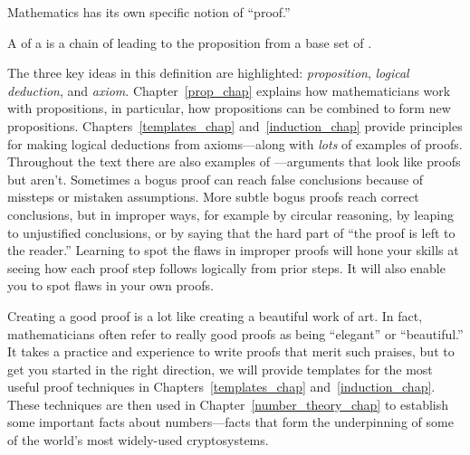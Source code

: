 Mathematics has its own specific notion of ``proof.''

\begin{definition*}
A  of a  is a chain of  leading to the proposition from a base set of .
\end{definition*}

The three key ideas in this definition are highlighted:
\emph{proposition}, \emph{logical deduction}, and \emph{axiom}.
Chapter~\ref{prop_chap} explains how mathematicians work with  propositions, in particular, how propositions can be combined
to form new propositions.  Chapters~\ref{templates_chap}
and~\ref{induction_chap} provide principles for making logical deductions
from axioms---along with \emph{lots} of examples of proofs.  Throughout
the text there are also examples of ---arguments that
look like proofs but aren't.  Sometimes a bogus proof can reach false
conclusions because of missteps or mistaken assumptions.  More subtle
bogus proofs reach correct conclusions, but in improper ways, for example
by circular reasoning, by leaping to unjustified conclusions, or by saying
that the hard part of ``the proof is left to the reader.''  Learning to
spot the flaws in improper proofs will hone your skills at seeing how each
proof step follows logically from prior steps.  It will also enable you to
spot flaws in your own proofs.

Creating a good proof is a lot like creating a beautiful work of art.  In
fact, mathematicians often refer to really good proofs as being
``elegant'' or ``beautiful.''  It takes a practice and experience to write
proofs that merit such praises,  but to get you started in
the right direction, we will provide templates for the most useful proof
techniques in Chapters~\ref{templates_chap} and~\ref{induction_chap}.
These techniques are then used in Chapter~\ref{number_theory_chap} to
establish some important facts about numbers---facts that form the
 underpinning of some of the world's most
widely-used cryptosystems.


\endinput
